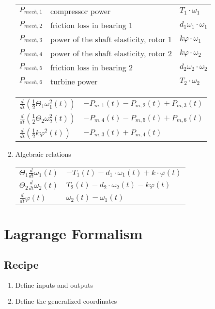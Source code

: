 \documentclass[10pt,a4paper]{scrartcl}
\begin{document}
\begin{multicols*}{3}
\begin{enumerate}
\small \begin{tabular}{l@{ = }l@{ = }l}
$P_{mech,1}$&compressor power& $T_1\cdot \omega_1$\\
$P_{mech,2}$&friction loss in bearing 1& $d_1\omega_1\cdot \omega_1$\\
$P_{mech,3}$&power of the shaft elasticity, rotor 1&$k\varphi\cdot\omega_1$\\
$P_{mech,4}$&power of the shaft elasticity, rotor 2&$k\varphi\cdot\omega_2$\\
$P_{mech,5}$&friction loss in bearing 2&$d_2\omega_2\cdot\omega_2$\\
$P_{mech,6}$&turbine power&$T_2\cdot\omega_2$
\end{tabular}
\normalsize

\vspace{3ex}

\begin{tabular}{l@{ = }l}
$\frac{d}{dt}\left(\frac{1}{2}\Theta_1\omega_1^2(t)\right)$&$-P_{m,1}(t)-P_{m,2}(t)+P_{m,3}(t)$\\
$\frac{d}{dt}\left(\frac{1}{2}\Theta_2\omega_2^2(t)\right)$&$-P_{m,4}(t)-P_{m,5}(t)+P_{m,6}(t)$\\
$\frac{d}{dt}\left(\frac{1}{2}k\varphi^2(t)\right)$&$-P_{m,3}(t)+P_{m,4}(t)$
\end{tabular}
\item Algebraic relations

\begin{tabular}{l@{ = }l}
$\Theta_1\frac{d}{dt} \omega_1(t)$&$-T_1(t)-d_1\cdot\omega_1(t)+k\cdot\varphi(t)$\\
$\Theta_2\frac{d}{dt}\omega_2(t)$&$T_2(t)-d_2\cdot\omega_2(t)-k\varphi(t)$\\
$\frac{d}{dt}\varphi(t)$&$\omega_2(t)-\omega_1(t)$
\end{tabular}
\end{enumerate}


\section{Lagrange Formalism}

\subsection{Recipe}

\begin{enumerate}
\item Define inputs and outputs
\item Define the generalized coordinates


\end{enumerate}
\end{multicols*}
\end{document}

